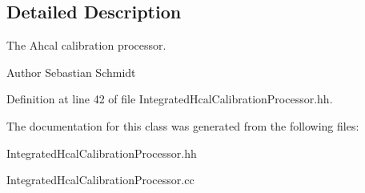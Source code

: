 \subsection{Detailed Description}
The Ahcal calibration processor. \begin{DoxyAuthor}{Author}
Sebastian Schmidt 
\end{DoxyAuthor}


Definition at line 42 of file IntegratedHcalCalibrationProcessor.hh.

The documentation for this class was generated from the following files:\begin{DoxyCompactItemize}
\item 
IntegratedHcalCalibrationProcessor.hh\item 
IntegratedHcalCalibrationProcessor.cc\end{DoxyCompactItemize}
